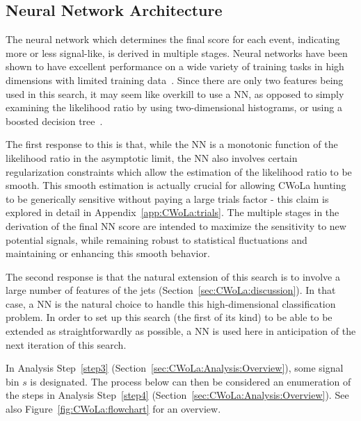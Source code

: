 \subsection{Neural Network Architecture}
\label{sec:CWoLa:network}
The neural network which determines the final score for each event, indicating more or less signal-like, is derived in multiple stages.
Neural networks have been shown to have excellent performance on a wide variety of training tasks in high dimensions with limited training data~\cite{haykin1994neural,Kriesel2007NeuralNetworks,bishop_2013,reed_marks_1999,goodfellow_bengio_courville_2017,ng2000cs229}.
Since there are only two features being used in this search, it may seem like overkill to use a NN, as opposed to simply examining the likelihood ratio by using two-dimensional histograms, or using a boosted decision tree~\cite{friedman2001greedy,friedman2002stochastic,friedman2000additive,friedman2001elements}.

The first response to this is that, while the NN is a monotonic function of the likelihood ratio in the asymptotic limit, the NN also involves certain regularization constraints which allow the estimation of the likelihood ratio to be smooth.
This smooth estimation is actually crucial for allowing CWoLa hunting to be generically sensitive without paying a large trials factor - this claim is explored in detail in Appendix~\ref{app:CWoLa:trials}.
The multiple stages in the derivation of the final NN score are intended to maximize the sensitivity to new potential signals, while remaining robust to statistical fluctuations and maintaining or enhancing this smooth behavior.

The second response is that the natural extension of this search is to involve a large number of features of the jets (Section~\ref{sec:CWoLa:discussion}).
In that case, a NN is the natural choice to handle this high-dimensional classification problem.
In order to set up this search (the first of its kind) to be able to be extended as straightforwardly as possible, a NN is used here in anticipation of the next iteration of this search.

In Analysis Step~\ref{step3} (Section~\ref{sec:CWoLa:Analysis:Overview}), some signal bin $s$ is designated. The process below can then be considered an enumeration of the steps in Analysis Step~\ref{step4} (Section~\ref{sec:CWoLa:Analysis:Overview}).
See also Figure~\ref{fig:CWoLa:flowchart} for an overview. 

